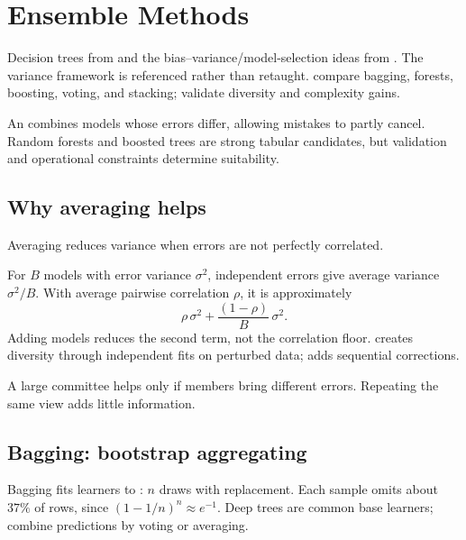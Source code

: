 \chapter{Ensemble Methods}
\label{ch:ensembles}

\chapterguide%
  {Decision trees from  and the bias--variance/model-selection ideas from . The variance framework is referenced rather than retaught.}
  {compare bagging, forests, boosting, voting, and stacking; validate diversity and complexity gains.}

An  combines models whose errors differ, allowing mistakes to partly cancel. Random forests and boosted trees are strong tabular candidates, but validation and operational constraints determine suitability.

\section{Why averaging helps}

Averaging reduces variance when errors are not perfectly correlated.

For $B$ models with error variance $\sigma^2$, independent errors give average variance $\sigma^2/B$. With average pairwise correlation $\rho$, it is approximately
\[
  \rho\,\sigma^2+\frac{(1-\rho)}{B}\,\sigma^2 .
\]
Adding models reduces the second term, not the correlation floor.  creates diversity through independent fits on perturbed data;  adds sequential corrections.

\begin{intuition}
A large committee helps only if members bring different errors. Repeating the same view adds little information.
\end{intuition}

\section{Bagging: bootstrap aggregating}

Bagging fits learners to : $n$ draws with replacement. Each sample omits about $37\%$ of rows, since $(1-1/n)^n\approx e^{-1}$. Deep trees are common base learners; combine predictions by voting or averaging.

